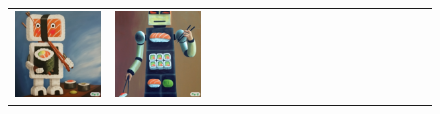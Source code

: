 \begin{figure}[ht!]
\begin{adjustwidth}{-0.8in}{-0.5in}
\begin{tabular}{cccccccccccccccccccc}
\multicolumn{2}{c}{\includegraphics[width=\threebythreecolwidth\textwidth]{figures/cherries/sushi_robot_6.jpg}} &
\multicolumn{2}{c}{\includegraphics[width=\threebythreecolwidth\textwidth]{figures/cherries/sushi_robot_7.jpg}} &

\end{tabular}
\end{adjustwidth}
\end{figure}
